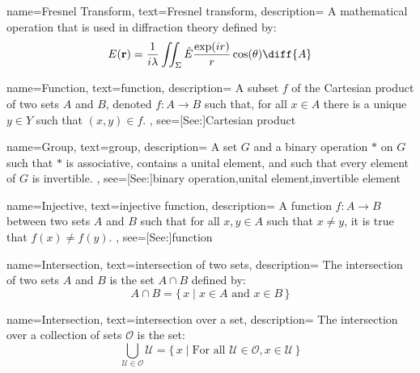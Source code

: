{
    name={Fresnel Transform},
    text={Fresnel transform},
    description={
        A mathematical operation that is used in diffraction theory
        defined by:
        \begin{equation*}
            E(\mathbf{r})=\frac{1}{i\lambda}
                \iint_{\Sigma}\hat{E}\frac{\exp(ir)}{r}
                    \cos(\theta)\diff{A}
        \end{equation*}
    }
}

{
    name={Function},
    text={function},
    description={
        A subset $f$ of the Cartesian product of two sets $A$ and $B$,
        denoted $f:A\rightarrow{B}$ such that, for all $x\in{A}$ there is
        a unique $y\in{Y}$ such that $(x,y)\in{f}$.
    },
    see=[See:]{Cartesian product}
}

{
    name={Group},
    text={group},
    description={
        A set $G$ and a binary operation $*$ on $G$ such that
        $*$ is associative, contains a unital element, and such that
        every element of $G$ is invertible.
    },
    see=[See:]{binary operation,unital element,invertible element}
}

{
    name={Injective},
    text={injective function},
    description={
        A function $f:A\rightarrow{B}$ between two sets $A$ and $B$ such
        that for all $x,y\in{A}$ such that $x\ne{y}$, it is true that
        $f(x)\ne{f}(y)$.
    },
    see=[See:]{function}
}

{
    name={Intersection},
    text={intersection of two sets},
    description={
        The intersection of two sets $A$ and $B$ is the set $A\cap{B}$
        defined by:
        \begin{equation*}
            A\cap{B}=\big\{\,x\;|\;x\in{A}\textrm{ and }x\in{B}\,\big\}
        \end{equation*}
    }
}

{
    name={Intersection},
    text={intersection over a set},
    description={
        The intersection over a collection of sets $\mathcal{O}$ is the set:
        \begin{equation*}
            \bigcup_{\mathcal{U}\in\mathcal{O}}\mathcal{U}
            =\big\{\,x\;|\;\textrm{For all }\mathcal{U}\in\mathcal{O},
                x\in\mathcal{U}\,\big\}
        \end{equation*}
    }
}

